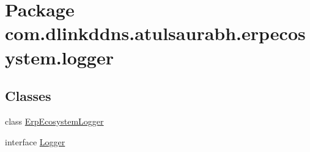 \hypertarget{namespacecom_1_1dlinkddns_1_1atulsaurabh_1_1erpecosystem_1_1logger}{}\section{Package com.\+dlinkddns.\+atulsaurabh.\+erpecosystem.\+logger}
\label{namespacecom_1_1dlinkddns_1_1atulsaurabh_1_1erpecosystem_1_1logger}
\subsection*{Classes}
\begin{DoxyCompactItemize}
\item 
class \mbox{\hyperlink{classcom_1_1dlinkddns_1_1atulsaurabh_1_1erpecosystem_1_1logger_1_1_erp_ecosystem_logger}{Erp\+Ecosystem\+Logger}}
\item 
interface \mbox{\hyperlink{interfacecom_1_1dlinkddns_1_1atulsaurabh_1_1erpecosystem_1_1logger_1_1_logger}{Logger}}
\end{DoxyCompactItemize}
